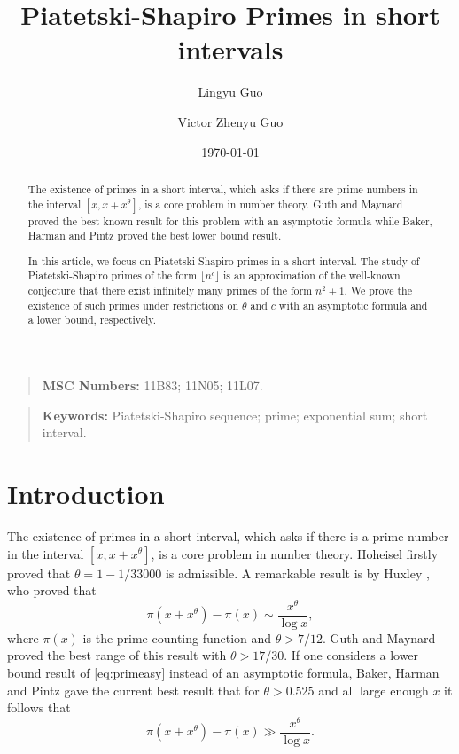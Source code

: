 \documentclass[12pt, reqno, twoside, letterpaper]{amsart}
\title[Piatetski-Shapiro Primes in short intervals]
{Piatetski-Shapiro Primes in short intervals}
\author[Lingyu Guo]{Lingyu Guo}
\author[Victor Zhenyu Guo]{Victor Zhenyu Guo}
\date{\today}
\numberwithin{equation}{section}
\theoremstyle{customthm}
\theoremstyle{customrem}
\begin{document}
	
	\begin{abstract}
    The existence of primes in a short interval, which asks if there are prime numbers in the interval $[x, x + x^\theta]$, is a core problem in number theory. Guth and Maynard proved the best known result for this problem with an asymptotic formula while Baker, Harman and Pintz proved the best lower bound result. 
    
    In this article, we focus on Piatetski-Shapiro primes in a short interval. The study of Piatetski-Shapiro primes of the form $\lfloor n^c \rfloor$ is an approximation of the well-known conjecture that there exist infinitely many primes of the form $n^2+1$. We prove the existence of such primes under restrictions on $\theta$ and $c$ with an asymptotic formula and a lower bound, respectively.  
	\end{abstract}
	
	\maketitle
	
	\begin{quote}
		\textbf{MSC Numbers:} 11B83; 11N05; 11L07.
	\end{quote}
	
	
	\begin{quote}
		\textbf{Keywords:} Piatetski-Shapiro sequence; prime; exponential sum; short interval. 
	\end{quote}
	
	
	
	\tableofcontents
	
	\newpage
	\section{Introduction}
	
The existence of primes in a short interval, which asks if there is a prime number in the interval $[x, x + x^\theta]$, is a core problem in number theory. Hoheisel \cite{Hoh1930} firstly proved that $\theta = 1 - 1/33000$ is admissible. A remarkable result is by Huxley \cite{Hux}, who proved that 
\begin{equation}
	\label{eq:primeasy}
	\pi(x+x^\theta) - \pi(x)\sim \frac{x^\theta}{\log x},
\end{equation}
where $\pi(x)$ is the prime counting function and $\theta > 7/12$. Guth and Maynard \cite{GM2025} proved the best range of this result with $\theta > 17/30$. If one considers a lower bound result of \eqref{eq:primeasy} instead of an asymptotic formula, Baker, Harman and Pintz \cite{BHP} gave the current best result that for $\theta > 0.525$ and all large enough $x$ it follows that
$$
\pi(x+x^\theta) - \pi(x) \gg \frac{x^\theta}{\log x}. 
$$
\end{document}
